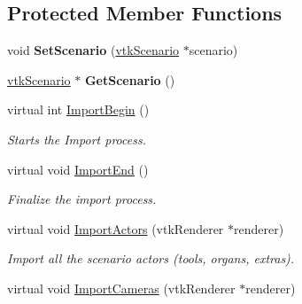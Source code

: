 \subsection*{Protected Member Functions}
\begin{DoxyCompactItemize}
\item 
\hypertarget{classvtkSRMLImporter_a2b5fcae9b96eb80eea0bce8d7797ba08}{
void {\bfseries SetScenario} (\hyperlink{classvtkScenario}{vtkScenario} $\ast$scenario)}
\label{classvtkSRMLImporter_a2b5fcae9b96eb80eea0bce8d7797ba08}

\item 
\hypertarget{classvtkSRMLImporter_a9d10d61a264ce3cdf7fff2c97082b005}{
\hyperlink{classvtkScenario}{vtkScenario} $\ast$ {\bfseries GetScenario} ()}
\label{classvtkSRMLImporter_a9d10d61a264ce3cdf7fff2c97082b005}

\item 
\hypertarget{classvtkSRMLImporter_a2701378d0e3f51e45130fb4e3a7c1e1e}{
virtual int \hyperlink{classvtkSRMLImporter_a2701378d0e3f51e45130fb4e3a7c1e1e}{ImportBegin} ()}
\label{classvtkSRMLImporter_a2701378d0e3f51e45130fb4e3a7c1e1e}

\begin{DoxyCompactList}\small\item\em Starts the Import process. \item\end{DoxyCompactList}\item 
\hypertarget{classvtkSRMLImporter_a34e78595a16f92d5f94e6b68cbf013a1}{
virtual void \hyperlink{classvtkSRMLImporter_a34e78595a16f92d5f94e6b68cbf013a1}{ImportEnd} ()}
\label{classvtkSRMLImporter_a34e78595a16f92d5f94e6b68cbf013a1}

\begin{DoxyCompactList}\small\item\em Finalize the import process. \item\end{DoxyCompactList}\item 
\hypertarget{classvtkSRMLImporter_a99d8681ebe95807aaa083d13ab8e18b2}{
virtual void \hyperlink{classvtkSRMLImporter_a99d8681ebe95807aaa083d13ab8e18b2}{ImportActors} (vtkRenderer $\ast$renderer)}
\label{classvtkSRMLImporter_a99d8681ebe95807aaa083d13ab8e18b2}

\begin{DoxyCompactList}\small\item\em Import all the scenario actors (tools, organs, extras). \item\end{DoxyCompactList}\item 
\hypertarget{classvtkSRMLImporter_a05d3a78ee727341e8e983fdc20774fec}{
virtual void \hyperlink{classvtkSRMLImporter_a05d3a78ee727341e8e983fdc20774fec}{ImportCameras} (vtkRenderer $\ast$renderer)}
\label{classvtkSRMLImporter_a05d3a78ee727341e8e983fdc20774fec}


\end{DoxyCompactItemize}
